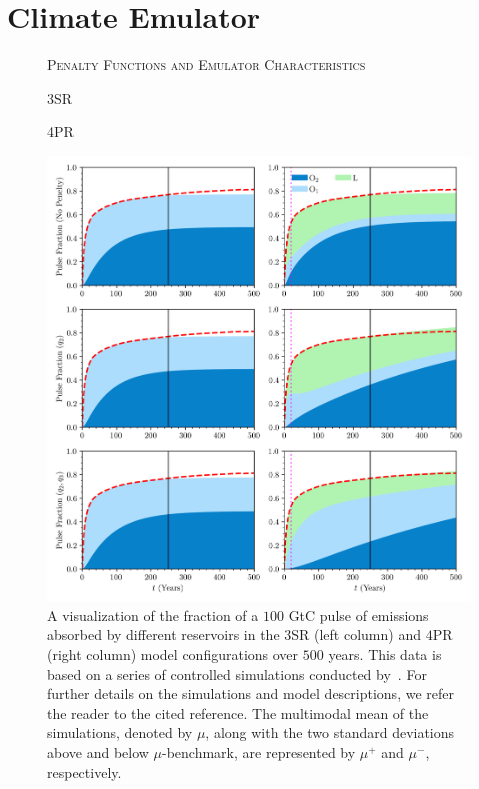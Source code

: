 \documentclass[11pt, a4paper, pdftex, twoside, dvipsnames]{article}
\begin{document}
\newpage
\clearpage
\appendix
\section{Climate Emulator}
\setcounter{figure}{0}                       %
\renewcommand\thefigure{A.\arabic{figure}}   %

\newpage
\begin{figure}[!htbp]
    \centering
    \noindent
    \textsc{Penalty Functions and Emulator Characteristics}\vspace{2em}
\begin{minipage}{0.5\textwidth}
	\noindent
	\centering
	\hspace{3em}\small{\textsc{3SR}}
\end{minipage}%
\begin{minipage}{0.5\textwidth}
	\noindent
	\centering
	\small{\textsc{4PR}}
\end{minipage}
    \includegraphics[width=\textwidth]{fig/analysis_flux_pen.png}
    \caption{
A visualization of the fraction of a $100$ GtC pulse of emissions absorbed by different reservoirs in the $3$SR (left column) and $4$PR (right column) model configurations over $500$ years.
    This data is based on a series of controlled simulations conducted by~\cite{joos2013carbon}.
    For further details on the simulations and model descriptions, we refer the reader to the cited reference.
    The multimodal mean of the simulations, denoted by $\mu$, along with the two standard deviations above and below $\mu$-benchmark, are represented by $\mu^+$ and $\mu^-$, respectively.
     }
    \label{fig:penelty_motiv}
\end{figure}
\end{document}
